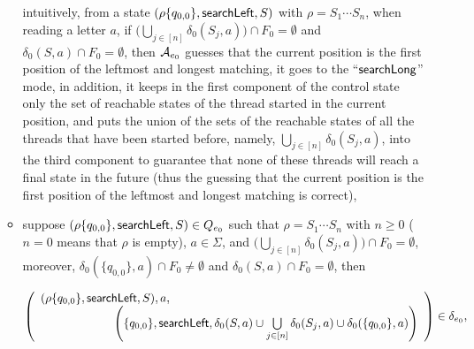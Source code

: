 \begin{itemize}
\begin{itemize}
		\medskip
		intuitively, from a state $(\rho \{q_{0,0}\}, \mathsf{searchLeft}, S)$ with $\rho = S_1 \cdots S_n$, when reading a letter $a$, if $\big(\bigcup \limits_{j \in [n]} \delta_0(S_j, a) \big) \cap F_0 = \emptyset$ and $\delta_0(S,a) \cap F_0 = \emptyset$, then $\mathcal{A}_{e_0}$ guesses that the current position is the first position of the leftmost and longest matching, it goes to the ``$\mathsf{searchLong}$'' mode, in addition, it keeps in the first component of the control state only the set of reachable states of the thread started in the current position, and puts the union of the sets of the reachable states of all the threads that have been started before, namely, $\bigcup \limits_{j \in [n]} \delta_0(S_j, a)$, into the third component to guarantee that none of these threads will reach a final state in the future (thus the guessing that the current position is the first position of the leftmost and longest matching is correct),
		\item suppose $(\rho \{q_{0,0}\}, \mathsf{searchLeft}, S) \in Q_{e_0}$ such that $\rho = S_1 \cdots S_n$ with $n \ge 0$ ($n = 0$ means that $\rho$ is empty),  $a \in \Sigma$, and $\big(\bigcup \limits_{j \in [n]} \delta_0(S_j, a) \big) \cap F_0 = \emptyset$, moreover, $\delta_0(\{q_{0,0}\}, a) \cap F_0 \neq \emptyset$ and $\delta_0(S,a) \cap F_0 = \emptyset$, then
		
		\medskip
		$\left(
		\begin{array}{l l}
		(\rho \{q_{0,0}\}, \searchleft, S), a, &\\
		& \hspace{-2cm} \left(\{q_{0,0}\}, \searchleft, \delta_0(S,a) \cup \bigcup \limits_{j \in [n]} \delta_0(S_j, a) \cup \delta_0(\{q_{0,0}\}, a) \right)
		\end{array}
		\right) \in \delta_{e_0},$
		

\end{itemize}
\end{itemize}
